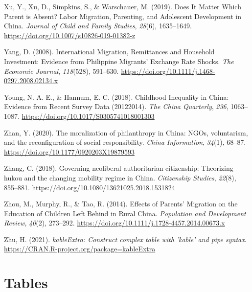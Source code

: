 \documentclass[
  man,floatsintext]{apa7}
\newlength{\cslhangindent}
\newlength{\cslentryspacingunit} %
\newenvironment{CSLReferences}[2] %
 {%
  \setlength{\parindent}{0pt}
  \ifodd #1
  \let\oldpar\par
  \def\par{\hangindent=\cslhangindent\oldpar}
  \fi
  \setlength{\parskip}{#2\cslentryspacingunit}
 }%
 {}
\begin{document}
\begin{CSLReferences}{1}{0}
\leavevmode{}%
Xu, Y., Xu, D., Simpkins, S., \& Warschauer, M. (2019). Does It Matter Which Parent is Absent? Labor Migration, Parenting, and Adolescent Development in {China}. \emph{Journal of Child and Family Studies}, \emph{28}(6), 1635--1649. \url{https://doi.org/10.1007/s10826-019-01382-z}

\leavevmode{}%
Yang, D. (2008). International Migration, Remittances and Household Investment: Evidence from Philippine Migrants{'} Exchange Rate Shocks. \emph{The Economic Journal}, \emph{118}(528), 591--630. \url{https://doi.org/10.1111/j.1468-0297.2008.02134.x}

\leavevmode{}%
Young, N. A. E., \& Hannum, E. C. (2018). Childhood Inequality in {China}: Evidence from Recent Survey Data (2012{\textendash}2014). \emph{The {China} Quarterly}, \emph{236}, 1063--1087. \url{https://doi.org/10.1017/S0305741018001303}

\leavevmode{}%
Zhan, Y. (2020). The moralization of philanthropy in {China}: NGOs, voluntarism, and the reconfiguration of social responsibility. \emph{{China} Information}, \emph{34}(1), 68--87. \url{https://doi.org/10.1177/0920203X19879593}

\leavevmode{}%
Zhang, C. (2018). Governing neoliberal authoritarian citizenship: Theorizing hukou and the changing mobility regime in {China}. \emph{Citizenship Studies}, \emph{22}(8), 855--881. \url{https://doi.org/10.1080/13621025.2018.1531824}

\leavevmode{}%
Zhou, M., Murphy, R., \& Tao, R. (2014). Effects of Parents' Migration on the Education of Children Left Behind in Rural {China}. \emph{Population and Development Review}, \emph{40}(2), 273--292. \url{https://doi.org/10.1111/j.1728-4457.2014.00673.x}

\leavevmode{}%
Zhu, H. (2021). \emph{kableExtra: Construct complex table with 'kable' and pipe syntax}. \url{https://CRAN.R-project.org/package=kableExtra}

\end{CSLReferences}

\newpage

\hypertarget{appendix-the-appendix}{%
\appendix}


\hypertarget{tables}{%
\section{Tables}\label{tables}}
\end{document}
